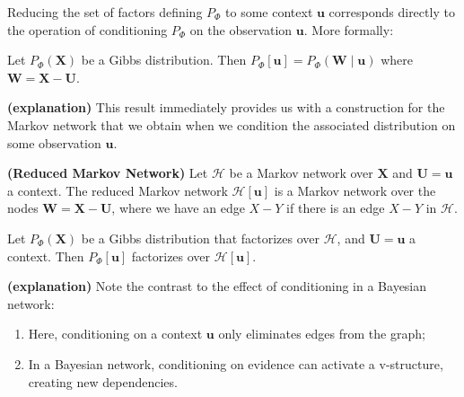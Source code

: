 \documentclass{article}
\newcommand{\bfs}[1]{\textbf{({#1}) }}
\begin{document}
Reducing the set of factors defining $P_{\Phi}$ to some context $\boldsymbol{u}$ corresponds directly to the operation of conditioning $P_{\Phi}$ on the observation $\boldsymbol{u}$. More formally:
\begin{lema}
Let $P_{\Phi}(\boldsymbol{X})$ be a Gibbs distribution. Then $P_{\Phi}[\boldsymbol{u}]=P_{\Phi}(\boldsymbol{W} \mid \boldsymbol{u})$ where $\boldsymbol{W}=\boldsymbol{X}-\boldsymbol{U}$.
\end{lema}
\begin{rema}\bfs{explanation}
This result immediately provides us with a construction for the Markov network that we obtain when we condition the associated distribution on some observation $\boldsymbol{u}$.
\end{rema}
\begin{defa}\bfs{Reduced Markov Network}
 Let $\mathcal{H}$ be a Markov network over $\boldsymbol{X}$ and $\boldsymbol{U}=\boldsymbol{u}$ a context. The reduced Markov network $\mathcal{H}[\boldsymbol{u}]$ is a Markov network over the nodes $\boldsymbol{W}=\boldsymbol{X}-\boldsymbol{U}$, where we have an edge $X-Y$ if there is an edge $X-Y$ in $\mathcal{H}$.
\end{defa}
\begin{lema}

Let $P_{\Phi}(\boldsymbol{X})$ be a Gibbs distribution that factorizes over $\mathcal{H}$, and $\boldsymbol{U}=\boldsymbol{u}$ a context. Then $P_{\Phi}[\boldsymbol{u}]$ factorizes over $\mathcal{H}[\boldsymbol{u}]$.
\end{lema}
\begin{rema}\bfs{explanation}
Note the contrast to the effect of conditioning in a Bayesian network: 
\begin{enumerate}
    \item Here, conditioning on a context $\boldsymbol{u}$ only eliminates edges from the graph; 
    \item In a Bayesian network, conditioning on evidence can activate a v-structure, creating new dependencies. 
\end{enumerate}
\end{rema}
\end{document}
